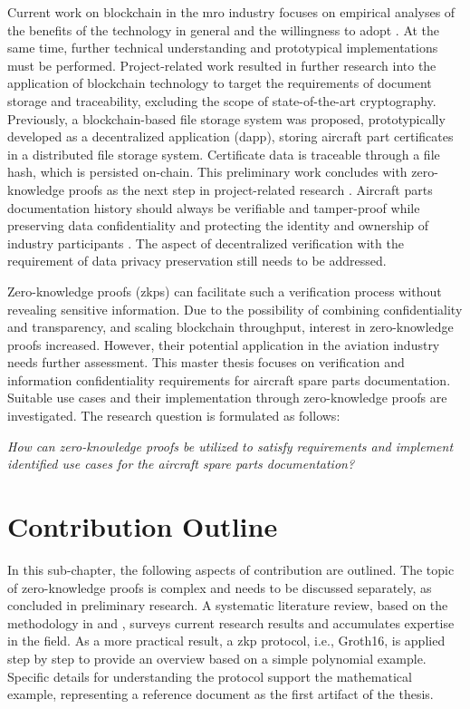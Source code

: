 Current work on blockchain in the \acrshort{mro} industry focuses on empirical analyses of the benefits of the technology in general and the willingness to adopt \citep{efthymiou}. At the same time, further technical understanding and prototypical implementations must be performed. Project-related work resulted in further research into the application of blockchain technology to target the requirements of document storage and traceability, excluding the scope of state-of-the-art cryptography. Previously, a blockchain-based file storage system was proposed, prototypically developed as a decentralized application (\acrshort{dapp}), storing aircraft part certificates in a distributed file storage system. Certificate data is traceable through a file hash, which is persisted on-chain. This preliminary work concludes with zero-knowledge proofs as the next step in project-related research \citep{ZedelJ}. Aircraft parts documentation history should always be verifiable and tamper-proof while preserving data confidentiality and protecting the identity and ownership of industry participants \citep{Wickboldt2019BlockchainFW}. The aspect of decentralized verification with the requirement of data privacy preservation still needs to be addressed.

Zero-knowledge proofs (\acrshort{zkp}s) can facilitate such a verification process without revealing sensitive information. Due to the possibility of combining confidentiality and transparency, and scaling blockchain throughput, interest in zero-knowledge proofs increased. However, their potential application in the aviation industry needs further assessment. This master thesis focuses on verification and information confidentiality requirements for aircraft spare parts documentation. Suitable use cases and their implementation through zero-knowledge proofs are investigated. The research question is formulated as follows:

\begin{center}
\textit{How can zero-knowledge proofs be utilized to satisfy requirements and implement identified use cases for the aircraft spare parts documentation?}  
\end{center}

\section{Contribution Outline}
In this sub-chapter, the following aspects of contribution are outlined. The topic of zero-knowledge proofs is complex and needs to be discussed separately, as concluded in preliminary research. A systematic literature review, based on the methodology in \citet{vomBrockeJan2019TDgs} and \citet{Webster2002AnalyzingTP}, surveys current research results and accumulates expertise in the field. As a more practical result, a \acrshort{zkp} protocol, i.e., Groth16, is applied step by step to provide an overview based on a simple polynomial example. Specific details for understanding the protocol support the mathematical example, representing a reference document as the first artifact of the thesis.

